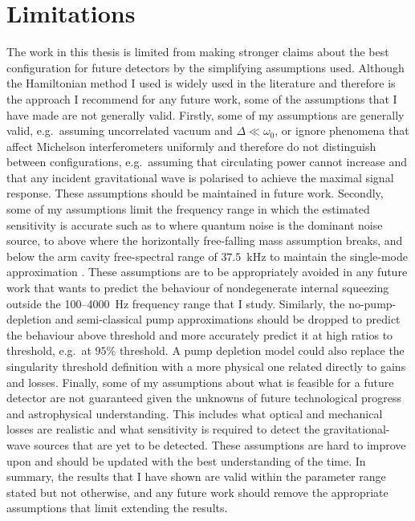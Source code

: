 \section{Limitations}

The work in this thesis is limited from making stronger claims about the best configuration for future detectors by the simplifying assumptions used. Although the Hamiltonian method I used is widely used in the literature and therefore is the approach I recommend for any future work, some of the assumptions that I have made are not generally valid.
Firstly, some of my assumptions are generally valid, e.g.\ assuming uncorrelated vacuum and $\Delta\ll\omega_0$, or ignore phenomena that affect Michelson interferometers uniformly and therefore do not distinguish between configurations, e.g.\ assuming that circulating power cannot increase and that any incident gravitational wave is polarised to achieve the maximal signal response. These assumptions should be maintained in future work.
Secondly, some of my assumptions limit the frequency range in which the estimated sensitivity is accurate such as to where quantum noise is the dominant noise source, to above where  the horizontally free-falling mass assumption breaks, and below the arm cavity free-spectral range of $37.5$~kHz to maintain the single-mode approximation . These assumptions are to be appropriately avoided in any future work that wants to predict the behaviour of nondegenerate internal squeezing outside the 100--4000~Hz frequency range that I study. Similarly, the no-pump-depletion and semi-classical pump approximations should be dropped to predict the behaviour above threshold and more accurately predict it at high ratios to threshold, e.g.\ at $95\%$ threshold. A pump depletion model could also replace the singularity threshold definition with a more physical one related directly to gains and losses. 
Finally, some of my assumptions about what is feasible for a future detector are not guaranteed given the unknowns of future technological progress and astrophysical understanding. This includes what optical and mechanical losses are realistic and what sensitivity is required to detect the gravitational-wave sources that are yet to be detected. These assumptions are hard to improve upon and should be updated with the best understanding of the time.
In summary, the results that I have shown are valid within the parameter range stated but not otherwise, and any future work should remove the appropriate assumptions that limit extending the results.

